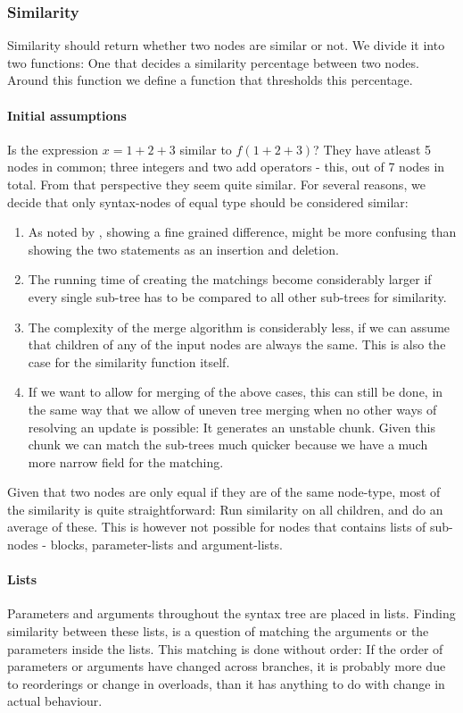 \documentclass[11pt]{article}
\begin{document}
\subsubsection{Similarity}
\label{FunctionSimilarity}
Similarity should return whether two nodes are similar or not. We divide it into two functions:  One that decides a similarity percentage between two nodes. Around this function we define a function that thresholds this percentage.

\paragraph{Initial assumptions} Is the expression $x=1+2+3$ similar to $f(1+2+3)$? They have atleast 5 nodes in common; three integers and two add operators - this, out of 7 nodes in total. From that perspective they seem quite similar. For several reasons, we decide that only syntax-nodes of equal type should be considered similar:

\begin{enumerate}
\item As noted by \citet{Hashimoto}, showing a fine grained difference, might be more confusing than showing the two statements as an insertion and deletion.
\item The running time of creating the matchings become considerably larger if every single sub-tree has to be compared to all other sub-trees  for similarity.
\item The complexity of the merge algorithm is considerably less, if we can assume that children of any of the input nodes are always the same. This is also the case for the similarity function itself.
\item If we want to allow for merging of the above cases, this can still be done, in the same way that we allow of uneven tree merging when no other ways of resolving an update is possible: It generates an unstable chunk. Given this chunk we can match the sub-trees much quicker because we have a much more narrow field for the matching.
\end{enumerate}

Given that two nodes are only equal if they are of the same node-type, most of the similarity is quite straightforward: Run similarity on all children, and do an average of these. This is however not possible for nodes that contains lists of sub-nodes - blocks, parameter-lists and argument-lists.

\paragraph{Lists} Parameters and arguments throughout the syntax tree are placed in lists. Finding similarity between these lists, is a question of matching the arguments or the parameters inside the lists. This matching is done without order: If the order of parameters or arguments have changed across branches, it is probably more due to reorderings or change in overloads, than it has anything to do with change in actual behaviour.
\end{document}
